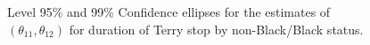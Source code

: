 \documentclass[12pt]{article}
\DeclareMathOperator{\AUC}{AUC}
\newcommand{\cind}{\perp \!\!\! \perp}
\newcommand{\aucindiv}{\theta_{11}}%
\newcommand{\aucpop}{\theta_{12}}%
\begin{document}
\begin{figure}[!tbp]
  \centering
  \hfill
  \caption{Level 95\% and 99\% Confidence ellipses for the estimates of $(\aucindiv,\aucpop)$ for duration of Terry stop by non-Black/Black status.}  \label{fig:data analysis:confidence ellipses}
\end{figure}





\end{document}
